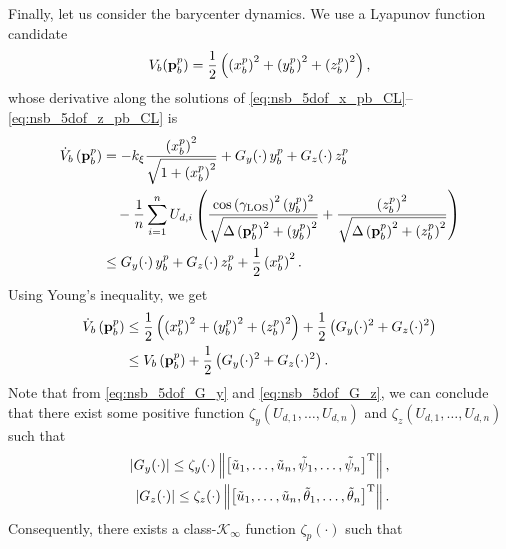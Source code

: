 Finally, let us consider the barycenter dynamics.
We use a Lyapunov function candidate
\begin{equation}
    V_b(\mathbf{p}_b^p) = \frac{1}{2} \left(\left(x_b^p\right)^2 + \left(y_b^p\right)^2 + \left(z_b^p\right)^2\right),
\end{equation}
whose derivative along the solutions of \eqref{eq:nsb_5dof_x_pb_CL}--\eqref{eq:nsb_5dof_z_pb_CL} is
\begin{equation}
    \begin{split}
        \dot{V}_b\left(\mathbf{p}_b^p\right) &= -k_{\xi}\frac{\left(x_b^p\right)^2}{\sqrt{1 + \left(x_b^p\right)^2}} + G_y(\cdot)\,y_b^p + G_z(\cdot)\,z_b^p \\
        &\quad - \frac{1}{n}\sum_{i=1}^n U_{d,i} \left(
            \frac{\cos\left(\gamma_{\rm LOS}\right)^2\left(y_b^p\right)^2}{\sqrt{\Delta\left(\mathbf{p}_b^p\right)^2 + \left(y_b^p\right)^2}} +
            \frac{\left(z_b^p\right)^2}{\sqrt{\Delta\left(\mathbf{p}_b^p\right)^2 + \left(z_b^p\right)^2}}
        \right) \\
        &\leq G_y(\cdot)\,y_b^p + G_z(\cdot)\,z_b^p + \frac{1}{2} \left(x_b^p\right)^2.
    \end{split}
\end{equation}
Using Young's inequality, we get
\begin{equation}
    \begin{split}
        \dot{V}_b\left(\mathbf{p}_b^p\right) &\leq \frac{1}{2} \left(\left(x_b^p\right)^2 + \left(y_b^p\right)^2 + \left(z_b^p\right)^2\right) + \frac{1}{2}\left(G_y(\cdot)^2 + G_z(\cdot)^2\right) \\
        &\leq V_b\left(\mathbf{p}_b^p\right) + \frac{1}{2}\left(G_y(\cdot)^2 + G_z(\cdot)^2\right).
    \end{split}
\end{equation}
Note that from \eqref{eq:nsb_5dof_G_y} and \eqref{eq:nsb_5dof_G_z}, we can conclude that there exist some positive function $\zeta_y(U_{d,1}, \ldots, U_{d,n})$ and $\zeta_z(U_{d,1}, \ldots, U_{d,n})$ such that
\begin{align}
    \left|G_y(\cdot)\right| \leq \zeta_y(\cdot) \left\| \left[\tilde{u}_1, \ldots, \tilde{u}_n, \tilde{\psi}_1, \ldots, \tilde{\psi}_n\right]^{\mathrm{T}} \right\|, \\
    \left|G_z(\cdot)\right| \leq \zeta_z(\cdot) \left\| \left[\tilde{u}_1, \ldots, \tilde{u}_n, \tilde{\theta}_1, \ldots, \tilde{\theta}_n\right]^{\mathrm{T}} \right\|.
\end{align}
Consequently, there exists a class-$\mathcal{K}_{\infty}$ function $\zeta_p(\cdot)$ such that
